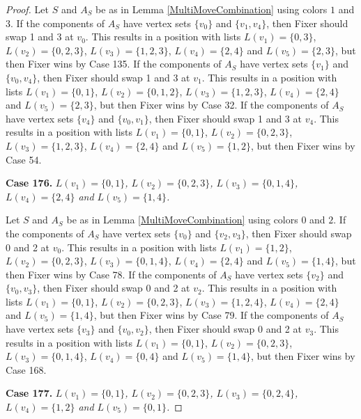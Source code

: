 \documentclass[12pt]{amsart}
\theoremstyle{plain}
\theoremstyle{definition}
\theoremstyle{remark}
\begin{document}
\begin{proof}
Let $S$ and $A_S$ be as in Lemma \ref{MultiMoveCombination} using colors $1$ and $3$. If the components of $A_S$ have vertex sets $\{v_0\}$ and $\{v_1, v_4\}$, then Fixer should swap 1 and 3 at $v_0$. This results in a position with lists $L(v_1) = \{0, 3\}$, $L(v_2) = \{0, 2, 3\}$, $L(v_3) = \{1, 2, 3\}$, $L(v_4) = \{2, 4\}$ and $L(v_5) = \{2, 3\}$, but then Fixer wins by Case 135.
If the components of $A_S$ have vertex sets $\{v_1\}$ and $\{v_0, v_4\}$, then Fixer should swap 1 and 3 at $v_1$. This results in a position with lists $L(v_1) = \{0, 1\}$, $L(v_2) = \{0, 1, 2\}$, $L(v_3) = \{1, 2, 3\}$, $L(v_4) = \{2, 4\}$ and $L(v_5) = \{2, 3\}$, but then Fixer wins by Case 32.
If the components of $A_S$ have vertex sets $\{v_4\}$ and $\{v_0, v_1\}$, then Fixer should swap 1 and 3 at $v_4$. This results in a position with lists $L(v_1) = \{0, 1\}$, $L(v_2) = \{0, 2, 3\}$, $L(v_3) = \{1, 2, 3\}$, $L(v_4) = \{2, 4\}$ and $L(v_5) = \{1, 2\}$, but then Fixer wins by Case 54.

\noindent\textbf{Case 176.  }\textit{$L(v_1) = \{0, 1\}$, $L(v_2) = \{0, 2, 3\}$, $L(v_3) = \{0, 1, 4\}$, $L(v_4) = \{2, 4\}$ and $L(v_5) = \{1, 4\}$.}

Let $S$ and $A_S$ be as in Lemma \ref{MultiMoveCombination} using colors $0$ and $2$. If the components of $A_S$ have vertex sets $\{v_0\}$ and $\{v_2, v_3\}$, then Fixer should swap 0 and 2 at $v_0$. This results in a position with lists $L(v_1) = \{1, 2\}$, $L(v_2) = \{0, 2, 3\}$, $L(v_3) = \{0, 1, 4\}$, $L(v_4) = \{2, 4\}$ and $L(v_5) = \{1, 4\}$, but then Fixer wins by Case 78.
If the components of $A_S$ have vertex sets $\{v_2\}$ and $\{v_0, v_3\}$, then Fixer should swap 0 and 2 at $v_2$. This results in a position with lists $L(v_1) = \{0, 1\}$, $L(v_2) = \{0, 2, 3\}$, $L(v_3) = \{1, 2, 4\}$, $L(v_4) = \{2, 4\}$ and $L(v_5) = \{1, 4\}$, but then Fixer wins by Case 79.
If the components of $A_S$ have vertex sets $\{v_3\}$ and $\{v_0, v_2\}$, then Fixer should swap 0 and 2 at $v_3$. This results in a position with lists $L(v_1) = \{0, 1\}$, $L(v_2) = \{0, 2, 3\}$, $L(v_3) = \{0, 1, 4\}$, $L(v_4) = \{0, 4\}$ and $L(v_5) = \{1, 4\}$, but then Fixer wins by Case 168.

\noindent\textbf{Case 177.  }\textit{$L(v_1) = \{0, 1\}$, $L(v_2) = \{0, 2, 3\}$, $L(v_3) = \{0, 2, 4\}$, $L(v_4) = \{1, 2\}$ and $L(v_5) = \{0, 1\}$.}


\end{proof}
\end{document}
